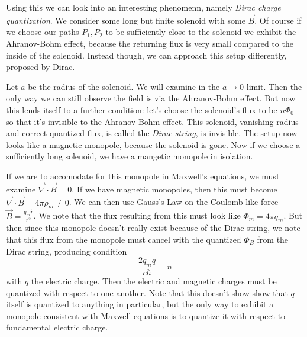 \documentclass[10pt]{report}
\begin{document}
Using this we can look into an interesting phenomenn, namely \emph{Dirac charge quantization}. We consider some long but finite solenoid with some $\vec{B}$. Of course if we choose our paths $P_1, P_2$ to be sufficiently close to the solenoid we exhibit the Ahranov-Bohm effect, because the returning flux is very small compared to the inside of the solenoid. Instead though, we can approach this setup differently, proposed by Dirac. 

Let $a$ be the radius of the solenoid. We will examine in the $a \to 0$ limit. Then the only way we can still observe the field is via the Ahranov-Bohm effect. But now this lends itself to a further condition: let's choose the solenoid's flux to be $n \Phi_0$ so that it's invisible to the Ahranov-Bohm effect. This solenoid, vanishing radius and correct quantized flux, is called the \emph{Dirac string}, is invisible. The setup now looks like a magnetic monopole, because the solenoid is gone. Now if we choose a sufficiently long solenoid, we have a mangetic monopole in isolation.

If we are to accomodate for this monopole in Maxwell's equations, we must examine $\vec{\nabla} \cdot \vec{B} = 0$. If we have magnetic monopoles, then this must become $\vec{\nabla} \cdot \vec{B} = 4\pi \rho_m \neq 0$. We can then use Gauss's Law on the Coulomb-like force $\vec{B} = \frac{q_m \hat{r}}{r^2}$. We note that the flux resulting from this must look like $\Phi_m = 4\pi q_m$. But then since this monopole doesn't really exist because of the Dirac string, we note that this flux from the monopole must cancel with the quantized $\Phi_B$ from the Dirac string, producing condition
\begin{equation}
    \frac{2q_m q}{c\hbar} = n
\end{equation}
with $q$ the electric charge. Then the electric and magnetic charges must be quantized with respect to one another. Note that this doesn't show show that $q$ itself is quantized to anything in particular, but the only way to exhibit a monopole consistent with Maxwell equations is to quantize it with respect to fundamental electric charge. 
\end{document}
